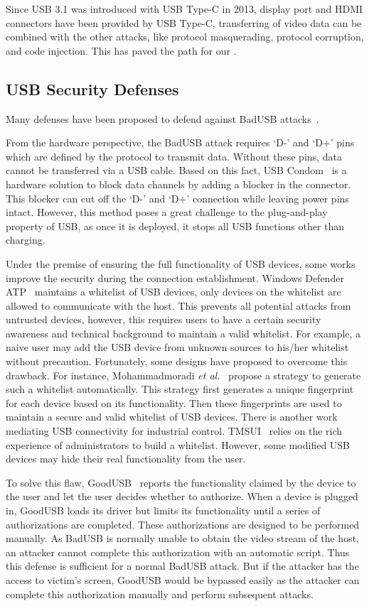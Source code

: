 Since USB 3.1 was introduced with USB Type-C in 2013, display port and HDMI
connectors have been provided by USB Type-C, transferring of video data can be
combined with the other attacks, like protocol masquerading,  protocol
corruption, and code injection. This has paved the path for our \tool.


\subsection{USB Security Defenses}
\label{subsec:usb_defence}

Many defenses have been proposed to defend against BadUSB attacks~\cite{sok}.

From the hardware perspective, the BadUSB attack requires `D-' and `D+' pins which
are defined by the protocol to transmit data. Without these pins, data cannot 
be transferred via a USB cable. Based
on this fact, USB Condom~\cite{Condom} is a hardware solution to block data
channels by adding a blocker in the connector. This blocker can cut off the `D-'
and `D+' connection while leaving power pins intact. However, this method poses
a great challenge to the plug-and-play property of USB, as once it is deployed, it
stops all USB functions other than charging.

Under the premise of ensuring the full functionality of USB devices, some works
improve the security during the connection establishment. Windows Defender
ATP~\cite{windenfenderwhite} maintains a whitelist of USB devices, only devices
on the whitelist are allowed to communicate with the host. This prevents all
potential attacks from untrusted devices, however, this requires users to have a
certain security awareness and technical background to maintain a valid
whitelist. For example, a naive user may add the USB device from unknown
sources to his/her whitelist without precaution. Fortunately, some designs have proposed to overcome
this drawback. For instance, Mohammadmoradi \emph{et al.}~\cite{mohammadmoradi2018making} propose a strategy to generate such a
whitelist automatically. This strategy first generates a unique fingerprint for
each device based on its functionality. Then these fingerprints are used to
maintain a secure and valid whitelist of USB devices. There is another work
mediating USB connectivity for industrial control. TMSUI~\cite{yang2015tmsui}
relies on the rich experience of administrators to build a whitelist. However, some
modified USB devices may hide their real functionality from the user.

To solve this flaw, GoodUSB~\cite{tian2015defending} reports the functionality claimed
by the device to the user and let the user decides whether to authorize. When a device
is plugged in, GoodUSB loads its driver but limits its functionality until a
series of authorizations are completed. These authorizations are designed to be
performed manually. As BadUSB is normally unable to obtain the video stream of
the host, an attacker cannot complete this authorization with
an automatic script. Thus this defense is sufficient for a normal BadUSB attack. But
if the attacker has the access to victim's screen, GoodUSB would be bypassed
easily as the attacker can complete this authorization manually and
perform subsequent attacks.

